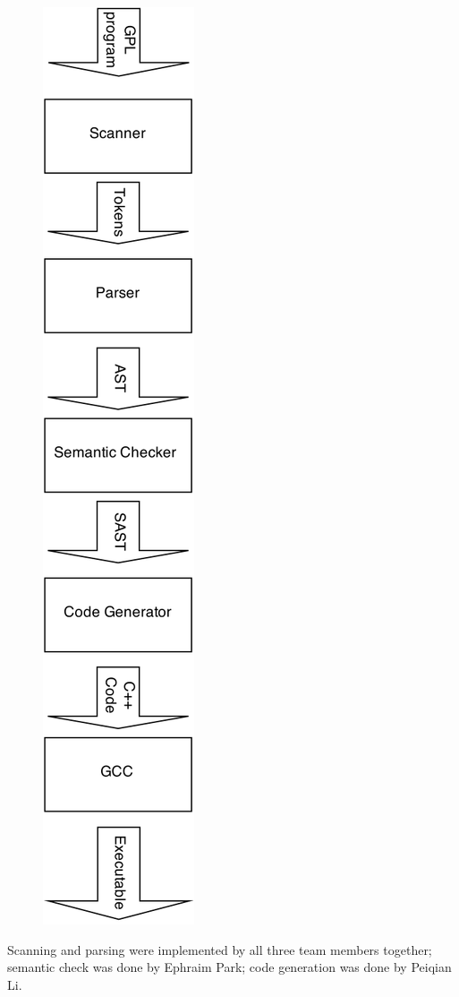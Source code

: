 \documentclass[a4paper,12pt]{article}
\begin{document}
\begin{figure}[h]
	\centering
	\includegraphics[scale=0.8]{block_diagram.png}
\end{figure}

Scanning and parsing were implemented by all three team members together; semantic check was done by Ephraim Park; code generation was done by Peiqian Li.
\end{document}
